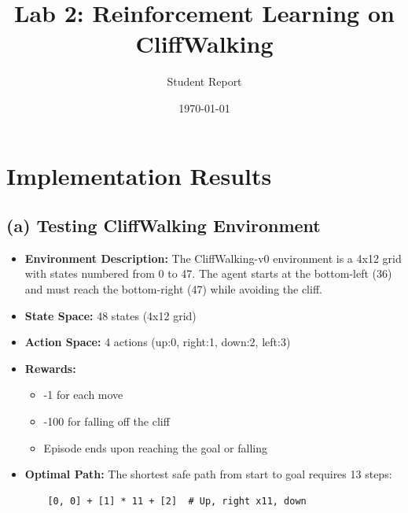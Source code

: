 \documentclass{article}
\title{Lab 2: Reinforcement Learning on CliffWalking}
\author{Student Report}
\date{\today}
\begin{document}
\maketitle

\section{Implementation Results}

\subsection*{(a) Testing CliffWalking Environment}
\begin{itemize}
    \item \textbf{Environment Description:}
    The CliffWalking-v0 environment is a 4x12 grid with states numbered from 0 to 47. The agent starts at the bottom-left (36) and must reach the bottom-right (47) while avoiding the cliff.
    
    \item \textbf{State Space:} 48 states (4x12 grid)
    \item \textbf{Action Space:} 4 actions (up:0, right:1, down:2, left:3)
    \item \textbf{Rewards:}
    \begin{itemize}
        \item -1 for each move
        \item -100 for falling off the cliff
        \item Episode ends upon reaching the goal or falling
    \end{itemize}
    
    \item \textbf{Optimal Path:}
    The shortest safe path from start to goal requires 13 steps:
    \begin{verbatim}
    [0, 0] + [1] * 11 + [2]  # Up, right x11, down
    \end{verbatim}
\end{itemize}
\end{document}
